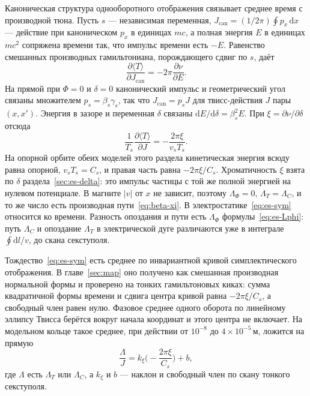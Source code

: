 \documentclass[aps,pra,preprint,a4paper,amsmath,amssymb,longbibliography]{revtex4-2}
\begin{document}
Каноническая структура однооборотного отображения связывает среднее время с производной тюна. Пусть $s$ --- независимая переменная, $J_{\mathrm{can}}=(1/2\pi)\oint p_x\,\mathrm{d}x$ --- действие при каноническом $p_x$ в единицах $mc$, а полная энергия $E$ в единицах $mc^2$ сопряжена времени так, что импульс времени есть $-E$. Равенство смешанных производных гамильтониана, порождающего сдвиг по $s$, даёт
\begin{equation}
\label{eq:es-dTdJ}
\frac{\partial\langle T\rangle}{\partial J_{\mathrm{can}}}
=-2\pi\frac{\partial\nu}{\partial E}.
\end{equation}
На прямой при $\Phi=0$ и $\delta=0$ канонический импульс и геометрический угол связаны множителем $p_s=\beta_s\gamma_s$, так что $J_{\mathrm{can}}=p_s J$ для твисс-действия $J$ пары $(x,x')$. Энергия в зазоре и переменная $\delta$ связаны $\mathrm{d}E/\mathrm{d}\delta=\beta_s^2 E$. При $\xi=\partial\nu/\partial\delta$ отсюда
\begin{equation}
\label{eq:es-sym}
\frac{1}{T_s}\frac{\partial\langle T\rangle}{\partial J}
=-\frac{2\pi\xi}{v_s T_s}.
\end{equation}
На опорной орбите обеих моделей этого раздела кинетическая энергия всюду равна опорной, $v_s T_s=C_s$, и правая часть равна $-2\pi\xi/C_s$. Хроматичность $\xi$ взята по $\delta$ раздела~\ref{sec:es-delta}: это импульс частицы с той же полной энергией на нулевом потенциале. В магните $|v|$ от $x$ не зависит, поэтому $\Lambda_\Phi=0$, $\Lambda_T=\Lambda_C$, и то же число есть производная пути~\eqref{eq:beta-xi}. В электростатике~\eqref{eq:es-sym} относится ко времени. Разность опоздания и пути есть $\Lambda_\Phi$ формулы~\eqref{eq:es-Lphi}: путь $\Lambda_C$ и опоздание $\Lambda_T$ в электрической дуге различаются уже в интеграле $\oint\mathrm{d}l/v$, до скана секступоля.

Тождество~\eqref{eq:es-sym} есть среднее по инвариантной кривой симплектического отображения. В главе~\ref{sec:map} оно получено как смешанная производная нормальной формы и проверено на тонких гамильтоновых киках: сумма квадратичной формы времени и сдвига центра кривой равна $-2\pi\xi/C_s$, а свободный член равен нулю. Фазовое среднее одного оборота по линейному эллипсу Твисса берётся вокруг начала координат и этого центра не включает. На модельном кольце такое среднее, при действии от $10^{-8}$ до $4\times 10^{-5}\,\text{м}$, ложится на прямую
\begin{equation}
\label{eq:es-scan}
\frac{\Lambda}{J}
=k_{\xi}\Biggl(-\frac{2\pi\xi}{C_s}\Biggr)+b,
\end{equation}
где $\Lambda$ есть $\Lambda_T$ или $\Lambda_C$, а $k_{\xi}$ и $b$ --- наклон и свободный член по скану тонкого секступоля.
\end{document}
